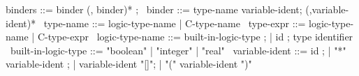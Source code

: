 \begin{syntax}
  binders ::= binder (, binder)* ;
  \
  binder ::= type-name variable-ident;
             (,variable-ident)*
  \
  type-name ::= logic-type-name | C-type-name
  \
  type-expr ::= logic-type-name | C-type-expr
  \
  logic-type-name ::= built-in-logic-type ;
  | id ; type identifier
  \
  built-in-logic-type ::= "boolean" | "integer" | "real"
  \
  variable-ident ::= id ;
  | "*" variable-ident ;
  | variable-ident "[]";
  | "(" variable-ident ")"
\end{syntax}
